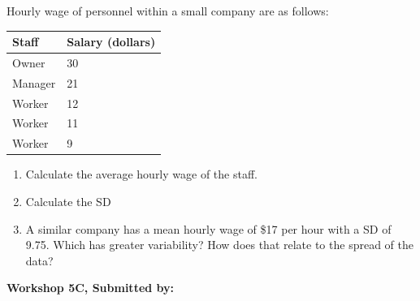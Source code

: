 \documentclass[11pt, chapterprefix=true]{scrbook}\usepackage[]{graphicx}\usepackage[]{color}
\begin{document}
\begin{exercises}
\begin{exercise}
Hourly wage of personnel within a small company are as follows:

\begin{tabular}{@{} ll @{}} \hline
Staff	&	Salary (dollars) \\ \hline
Owner		& 30 \\
Manager	& 21 \\
Worker	& 12 \\
Worker	& 11 \\
Worker	& 9 \\ \hline
\end{tabular}

\begin{enumerate}
  \item Calculate the average hourly wage of the staff.
  \item Calculate the SD
  \item A similar company has a mean hourly wage of \$17 per hour with a SD of 9.75.  Which has greater variability?  How does that relate to the spread of the data?
\end{enumerate}

\end{exercise} 
\begin{solution}  %

\end{solution}

\clearpage

    \begin{exercise}  %

    \begin{center}
\begin{flushleft}\textbf{\large \hfill Workshop 5C, Submitted by: }\end{flushleft}

\end{center}


\end{exercise}
\end{exercises}
\end{document}
